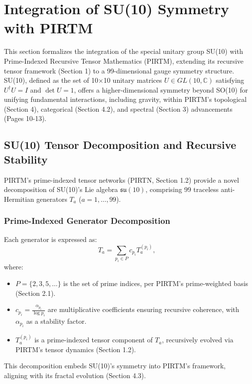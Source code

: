 \documentclass{article}
\theoremstyle{plain}
\begin{document}
\section{Integration of SU(10) Symmetry with PIRTM}

This section formalizes the integration of the special unitary group SU(10) with Prime-Indexed Recursive Tensor Mathematics (PIRTM), extending its recursive tensor framework (Section 1) to a 99-dimensional gauge symmetry structure. SU(10), defined as the set of 10$\times$10 unitary matrices \( U \in GL(10, \mathbb{C}) \) satisfying \( U^\dagger U = I \) and \( \det U = 1 \), offers a higher-dimensional symmetry beyond SO(10) for unifying fundamental interactions, including gravity, within PIRTM’s topological (Section 4), categorical (Section 4.2), and spectral (Section 3) advancements (Pages 10-13).

\subsection{SU(10) Tensor Decomposition and Recursive Stability}

PIRTM’s prime-indexed tensor networks (PIRTN, Section 1.2) provide a novel decomposition of SU(10)’s Lie algebra \( \mathfrak{su}(10) \), comprising 99 traceless anti-Hermitian generators \( T_a \) (\( a = 1, \dots, 99 \)).

\subsubsection{Prime-Indexed Generator Decomposition}
Each generator is expressed as:
\[
T_a = \sum_{p_i \in P} c_{p_i} T_a^{(p_i)},
\]
where:
\begin{itemize}
    \item \( P = \{2, 3, 5, \dots\} \) is the set of prime indices, per PIRTM’s prime-weighted basis (Section 2.1).
    \item \( c_{p_i} = \frac{\alpha_{p_i}}{\log p_i} \) are multiplicative coefficients ensuring recursive coherence, with \( \alpha_{p_i} \) as a stability factor.
    \item \( T_a^{(p_i)} \) is a prime-indexed tensor component of \( T_a \), recursively evolved via PIRTM’s tensor dynamics (Section 1.2).
\end{itemize}
This decomposition embeds SU(10)’s symmetry into PIRTM’s framework, aligning with its fractal evolution (Section 4.3).
\end{document}
